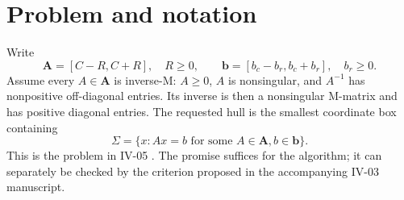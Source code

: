 

\begin{abstract}
For a rational interval matrix whose every member is inverse-M, and an arbitrary rational interval right-hand side, we compute the exact solution hull using $2n$ linear programs with $n$ variables and $2n$ inequalities each. A complementary-parts linear program solves the relevant absolute value equations. A sign argument using the inverse-M promise proves that their solutions are attained coordinatewise hull endpoints. All claims are in exact rational bit complexity; floating-point test code is supplementary only.
\end{abstract}
\section{Problem and notation}
Write
\[
 \boldsymbol A=[C-R,C+R],\quad R\ge0,\qquad
 \boldsymbol b=[b_c-b_r,b_c+b_r],\quad b_r\ge0.
\]
Assume every $A\in\boldsymbol A$ is inverse-M: $A\ge0$, $A$ is nonsingular, and $A^{-1}$ has nonpositive off-diagonal entries. Its inverse is then a nonsingular M-matrix and has positive diagonal entries. The requested hull is the smallest coordinate box containing
\[
 \Sigma=\{x:Ax=b\text{ for some }A\in\boldsymbol A,
                                  b\in\boldsymbol b\}.
\]
This is the problem in IV-05 \cite{repo,overview}. The promise suffices for the algorithm; it can separately be checked by the criterion proposed in the accompanying IV-03 manuscript.
